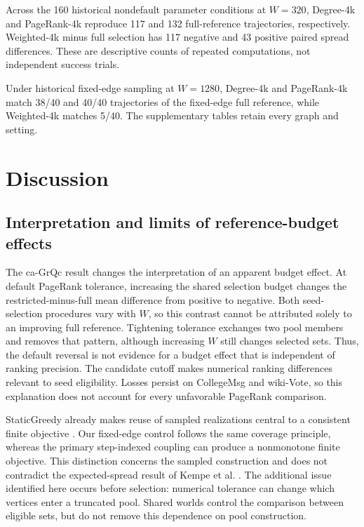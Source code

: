 \documentclass[smallextended]{svjour3}
\begin{document}
Across the 160 historical nondefault parameter conditions at $W=320$, Degree-4k and PageRank-4k reproduce 117 and 132 full-reference trajectories, respectively. Weighted-4k minus full selection has 117 negative and 43 positive paired spread differences. These are descriptive counts of repeated computations, not independent success trials.

Under historical fixed-edge sampling at $W=1280$, Degree-4k and PageRank-4k match 38/40 and 40/40 trajectories of the fixed-edge full reference, while Weighted-4k matches 5/40. The supplementary tables retain every graph and setting.
\FloatBarrier

\section{Discussion}
\subsection{Interpretation and limits of reference-budget effects}
The ca-GrQc result changes the interpretation of an apparent budget effect. At default PageRank tolerance, increasing the shared selection budget changes the restricted-minus-full mean difference from positive to negative. Both seed-selection procedures vary with $W$, so this contrast cannot be attributed solely to an improving full reference. Tightening tolerance exchanges two pool members and removes that pattern, although increasing $W$ still changes selected sets. Thus, the default reversal is not evidence for a budget effect that is independent of ranking precision. The candidate cutoff makes numerical ranking differences relevant to seed eligibility. Losses persist on CollegeMsg and wiki-Vote, so this explanation does not account for every unfavorable PageRank comparison.

StaticGreedy already makes reuse of sampled realizations central to a consistent finite objective \cite{ref8}. Our fixed-edge control follows the same coverage principle, whereas the primary step-indexed coupling can produce a nonmonotone finite objective. This distinction concerns the sampled construction and does not contradict the expected-spread result of Kempe et al. \cite{ref1}. The additional issue identified here occurs before selection: numerical tolerance can change which vertices enter a truncated pool. Shared worlds control the comparison between eligible sets, but do not remove this dependence on pool construction.
\end{document}
